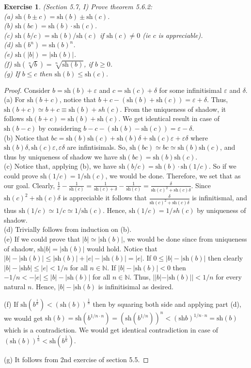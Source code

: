 \documentclass[a4paper, 11pt]{book}
\theoremstyle{plain}
\newtheorem{exercise}{Exercise}[chapter]
\theoremstyle{plain}
\newcommand{\N}{\mathbb{N}}
\newcommand{\ep}{\varepsilon}
\newcommand{\del}{\delta}
\newcommand{\sh}{\text{sh}}
\begin{document}
  \begin{exercise}
    (Section 5.7, I)
    Prove theorem 5.6.2: \\
    (a) $\sh (b\pm c) = \sh (b) \pm \sh (c)$. \\
    (b) $\sh(bc)=\sh(b)\cdot \sh(c)$. \\
    (c) $\sh(b/c)=\sh(b)/\sh(c)$ if $\sh(c) \not = 0$ (ie $c$ is appreciable).\\ 
    (d) $\sh(b^n)=\sh(b)^n$. \\
    (e) $\sh (|b|)=|\sh (b)|$.\\
    (f) $\sh(\sqrt[n]{b})=\sqrt[n]{\sh(b)}$, if $b \geq 0$. \\
    (g) If $b \leq c$ then $\sh(b) \leq \sh(c)$.
  \end{exercise}
  \begin{proof} Consider $b=\sh(b)+\ep$ and $c=\sh(c)+\del$ for some infinitisimal $\ep$ and $\del$. \\
    (a) For $\sh(b+c)$, notice that $b+c-(\sh(b)+\sh(c))=\ep+\del$. Thus, $\sh(b+c) \simeq b+c \equiv \sh(b)+sh(c)$. From the uniqueness of shadow, it follows $\sh(b+c)=\sh(b)+\sh(c)$. We get identical result in case of $\sh(b-c)$ by considering $b-c-(\sh(b)-\sh(c))=\ep-\del$. \\

    (b) Notice that $bc=\sh(b)\sh(c)+\sh(b) \del +\sh(c)\ep +\ep\del$ where $\sh(b) \del, \sh(c)\ep, \ep\del$ are infintisimals. So, $\sh(bc) \simeq bc \simeq \sh(b)\sh(c)$, and thus by uniqueness of shadow we have $\sh(bc)=\sh(b)\sh(c)$.\\

    (c) Notice that, applying (b), we have $\sh(b/c)=\sh(b) \cdot \sh(1/c)$. So if we could prove $\sh(1/c)=1/\sh(c)$, we would be done. Therefore, we set that as our goal. Clearly, $\frac{1}{c}-\frac{1}{\sh(c)}=\frac{1}{\sh(c)+\del}-\frac{1}{\sh(c)}=\frac{\del}{\sh(c)^2+\sh(c)\del}$. Since $\sh(c)^2+\sh(c)\del$ is appreciable it follows that $\frac{\del}{\sh(c)^2+\sh(c)\del}$ is infinitismal, and thus $\sh(1/c) \simeq 1/c \simeq 1/\sh(c)$. Hence, $\sh(1/c)=1/sh(c)$ by uniqueness of shadow. \\

    (d) Trivially follows from induction on (b). \\

    (e) If we could prove that $|b|\simeq |\sh (b)|$, we would be done since from uniqueness of shadow, $\sh |b|=|\sh (b)|$ would hold. Notice that $|b|-|\sh (b)| \leq |\sh (b)|+|e|-|\sh (b)|=|e|$. If $0 \leq |b|-|\sh (b)|$ then clearly $|b|-|\sh b| \leq |e|<1/n$ for all $n \in \N$. If $|b|-|\sh (b)|<0$ then $-1/n<-|e| \leq |b|-|\sh(b)|$ for all $n \in \N$. Thus, $||b|-|\sh (b)||<1/n$ for every natural $n$. Hence, $|b|-|\sh(b)$ is infinitisimal as desired. 

    (f) If $\sh(b^\frac{1}{n})<(\sh (b))^\frac{1}{n}$ then by squaring both side and applying part (d), we would get $\sh (b)=\sh(b^{1/n \cdot n})=(\sh (b^{1/n}))^n<(\sh b)^{1/n \cdot n}=\sh(b)$ which is a contradiction. We would get identical contradiction in case of $(\sh (b))^\frac{1}{n}<\sh(b^\frac{1}{n})$. 

    (g) It follows from 2nd exercise of section 5.5.
  \end{proof}
\end{document}
